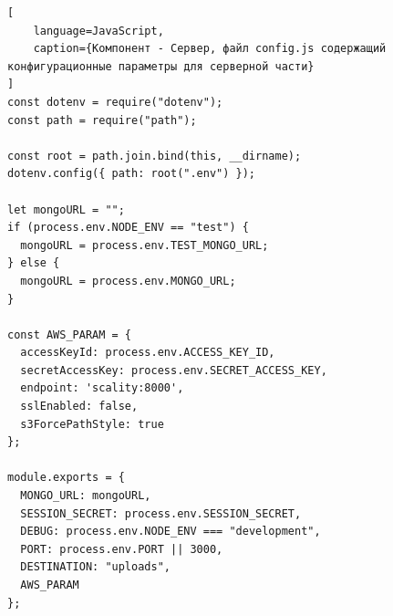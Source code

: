 \documentclass[%
  a5paper,
  subf,
  href,
  master,
  dotsinheaders 
]{csse-fcs}
\begin{document}
\begin{lstlisting}[
    language=JavaScript,
    caption={Компонент - Сервер, файл config.js содержащий конфигурационные параметры для серверной части}
]
const dotenv = require("dotenv");
const path = require("path");

const root = path.join.bind(this, __dirname);
dotenv.config({ path: root(".env") });

let mongoURL = "";
if (process.env.NODE_ENV == "test") {
  mongoURL = process.env.TEST_MONGO_URL;
} else {
  mongoURL = process.env.MONGO_URL;
}

const AWS_PARAM = {
  accessKeyId: process.env.ACCESS_KEY_ID,
  secretAccessKey: process.env.SECRET_ACCESS_KEY,
  endpoint: 'scality:8000',
  sslEnabled: false,
  s3ForcePathStyle: true
};

module.exports = {
  MONGO_URL: mongoURL,
  SESSION_SECRET: process.env.SESSION_SECRET,
  DEBUG: process.env.NODE_ENV === "development",
  PORT: process.env.PORT || 3000,
  DESTINATION: "uploads",
  AWS_PARAM
};

\end{lstlisting}
\end{document}
